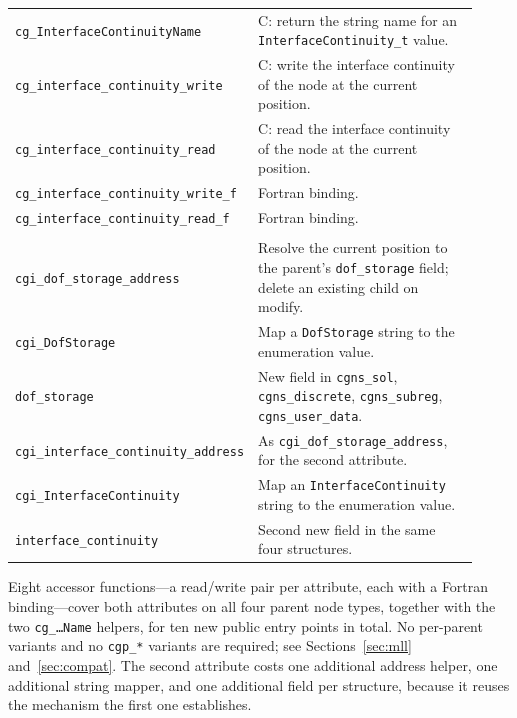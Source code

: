 \documentclass[11pt,letterpaper]{article}
\begin{document}
\begin{center}
\begin{longtable}{>{\raggedright\arraybackslash}p{0.42\linewidth} >{\raggedright\arraybackslash}p{0.50\linewidth}}
\texttt{cg\_InterfaceContinuity\allowbreak Name} & C: return the string name for an \texttt{InterfaceContinuity\_t} value. \\
\texttt{cg\_interface\_continuity\_\allowbreak write} & C: write the interface continuity of the node at the current position. \\
\texttt{cg\_interface\_continuity\_\allowbreak read} & C: read the interface continuity of the node at the current position. \\
\texttt{cg\_interface\_continuity\_\allowbreak write\_f} & Fortran binding. \\
\texttt{cg\_interface\_continuity\_\allowbreak read\_f} & Fortran binding. \\
\addlinespace
\multicolumn{2}{@{}l}{\textit{Internal (\texttt{cgns\_header.h})}} \\
\texttt{cgi\_dof\_storage\_address} & Resolve the current position to the parent's \texttt{dof\_storage} field; delete an existing child on modify. \\
\texttt{cgi\_DofStorage} & Map a \texttt{DofStorage} string to the enumeration value. \\
\texttt{dof\_storage} & New field in \texttt{cgns\_sol}, \texttt{cgns\_discrete}, \texttt{cgns\_subreg}, \texttt{cgns\_user\_data}. \\
\texttt{cgi\_interface\_continuity\_\allowbreak address} & As \texttt{cgi\_dof\_storage\_address}, for the second attribute. \\
\texttt{cgi\_InterfaceContinuity} & Map an \texttt{InterfaceContinuity} string to the enumeration value. \\
\texttt{interface\_continuity} & Second new field in the same four structures. \\
\bottomrule
\end{longtable}
\end{center}

\noindent Eight accessor functions---a read/write pair per attribute,
each with a Fortran binding---cover both attributes on all four parent
node types, together with the two \texttt{cg\_\ldots Name} helpers, for
ten new public entry points in total.  No
per-parent variants and no \texttt{cgp\_*} variants are required; see
Sections~\ref{sec:mll} and~\ref{sec:compat}.  The second attribute costs
one additional address helper, one additional string mapper, and one
additional field per structure, because it reuses the mechanism the first
one establishes.

\end{document}
